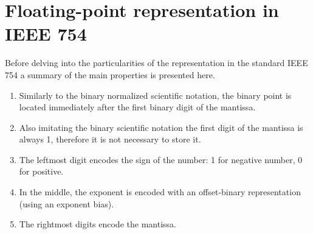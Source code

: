




    \section{Floating-point representation in IEEE 754}


Before delving into the particularities of the representation in the standard IEEE 754 a summary of the main properties is presented here. 

\begin{enumerate}
    \item Similarly to the binary normalized scientific notation, the binary point is located immediately after the first binary digit of the mantissa. 
    \item Also imitating the binary scientific notation the first digit of the mantissa is always 1, therefore it is not necessary to store it.
    \item The leftmost digit encodes the sign of the number: 1 for negative number, 0 for positive.
    \item In the middle, the exponent is encoded with an offset-binary representation (using an exponent bias).
    \item The rightmost digits encode the mantissa. 
\end{enumerate} 

